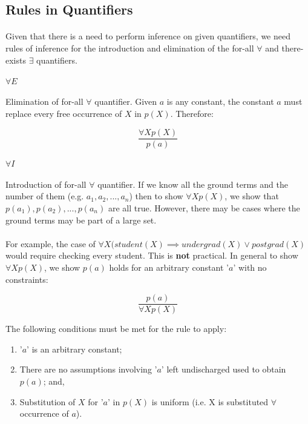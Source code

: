 \documentclass{article}
\theoremstyle{plain}
\theoremstyle{definition}
\begin{document}
\begin{multicols}{2}
\subsection{Rules in Quantifiers}

\paragraph{} Given that there is a need to perform inference on given quantifiers, we need rules of inference for the introduction and elimination of the for-all $\forall$ and there-exists $\exists$ quantifiers.

  \paragraph{$\forall E$} Elimination of for-all $\forall$ quantifier. Given $a$ is any constant, the constant $a$ must replace every free occurrence of $X$ in $p(X)$. Therefore:

\begin{equation*}  
\frac{\forall X p(X)}{p(a)}
\end{equation*}

  \paragraph{$\forall I$} Introduction of for-all $\forall$ quantifier. If we know all the ground terms and the number of them (e.g. $a_1, a_2, ..., a_n$) then to show $\forall X p(X)$, we show that $p(a_1), p(a_2), ..., p(a_n)$ are all true. However, there may be cases where the ground terms may be part of a large set.
  
  \paragraph{} For example, the case of $\forall X (student(X) \implies undergrad(X) \lor postgrad(X)$ would require checking every student. This is {\bf not} practical. In general to show $\forall X p(X)$, we show $p(a)$ holds for an arbitrary constant '$a$' with no constraints:

\begin{equation*}  
\frac{p(a)}{\forall X p(X)}
\end{equation*}

The following conditions must be met for the rule to apply:

\begin{enumerate}
\item '$a$' is an arbitrary constant;
\item There are no assumptions involving '$a$' left undischarged used to obtain $p(a)$; and,
\item Substitution of $X$ for '$a$' in $p(X)$ is uniform (i.e. X is substituted $\forall$ occurrence of $a$).
\end{enumerate}


\end{multicols}
\end{document}
